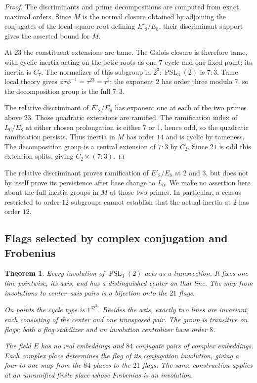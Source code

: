 \documentclass[11pt]{amsart}
\newtheorem{theorem}{Theorem}[section]
\theoremstyle{definition}
\theoremstyle{remark}
\newcommand{\PSL}{\operatorname{PSL}}
\begin{document}
\begin{proof}
The discriminants and prime decompositions are computed from exact maximal
orders.  Since $M$ is the normal closure obtained by adjoining the
conjugates of the local square root defining $E'_8/E_8$, their
discriminant support gives the asserted bound for $M$.

At $23$ the constituent extensions are tame.  The Galois closure is
therefore tame, with cyclic inertia acting on the octic roots as one
$7$-cycle and one fixed point; its inertia is $C_7$.  The normalizer of
this subgroup in $2^3{:}\PSL_3(2)$ is $7{:}3$.  Tame local theory gives
$\phi\tau\phi^{-1}=\tau^{23}=\tau^2$; the exponent $2$ has order three
modulo $7$, so the decomposition group is the full $7{:}3$.

The relative discriminant of $E'_8/E_8$ has exponent one at each of the
two primes above $23$.  Those quadratic extensions are ramified.
The ramification index of $L_0/E_8$ at either chosen prolongation is
either $7$ or $1$, hence odd, so the quadratic ramification persists.
Thus inertia in $M$ has order $14$ and is cyclic by tameness.
The decomposition group is a central extension of $7{:}3$ by $C_2$.
Since $21$ is odd this extension splits, giving $C_2\times(7{:}3)$.
\end{proof}

The relative discriminant proves ramification of $E'_8/E_8$ at $2$
and $3$, but does not by itself prove its persistence after base change
to $L_0$.  We make no assertion here about the full inertia groups in
$M$ at those two primes.  In particular, a census restricted to
order-$12$ subgroups cannot establish that the actual inertia at $2$
has order $12$.

\subsection{Flags selected by complex conjugation and Frobenius}
\label{sec:flags}

\begin{theorem}\label{thm:flags}
Every involution of $\PSL_3(2)$ acts as a transvection.  It fixes one line
pointwise, its axis, and has a distinguished center on that line.  The map
from involutions to center--axis pairs is a bijection onto the $21$ flags.

On points the cycle type is $1^32^2$.  Besides the axis, exactly two lines
are invariant, each consisting of the center and one transposed pair.  The
group is transitive on flags; both a flag stabilizer and an involution
centralizer have order $8$.

The field $E$ has no real embeddings and $84$ conjugate pairs of complex
embeddings.  Each complex place determines the flag of its conjugation
involution, giving a four-to-one map from the $84$ places to the $21$ flags.
The same construction applies at an unramified finite place whose Frobenius
is an involution.
\end{theorem}
\end{document}
